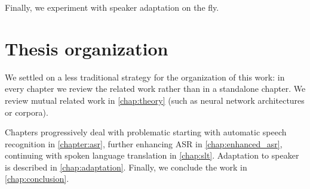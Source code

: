 Finally, we experiment with speaker adaptation on the fly. 

\section*{Thesis organization}
We settled on a less traditional strategy for the organization of this work: in every chapter we review the related work rather than in a standalone chapter. We review mutual related work in \cref{chap:theory} (such as neural network architectures or corpora).

Chapters progressively deal with problematic starting with automatic speech recognition in \cref{chapter:asr}, further enhancing ASR in \cref{chap:enhanced_asr}, continuing with spoken language translation in \cref{chap:slt}. Adaptation to speaker is described in \cref{chap:adaptation}. Finally, we conclude the work in \cref{chap:conclusion}.
